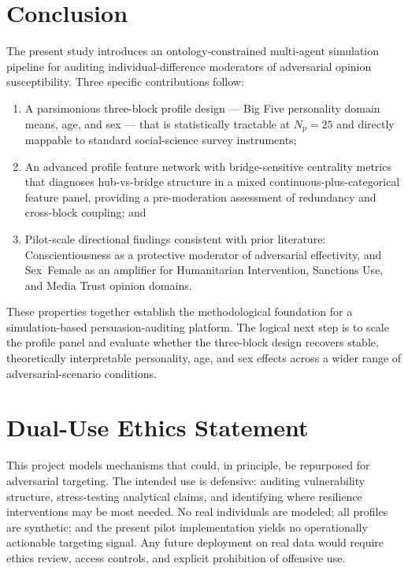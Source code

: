 \documentclass[11pt,a4paper]{article}
\begin{document}
\section{Conclusion}

The present study introduces an ontology-constrained multi-agent simulation pipeline for auditing individual-difference moderators of adversarial opinion susceptibility. Three specific contributions follow:
\begin{enumerate}
  \item A parsimonious three-block profile design --- Big Five personality domain means, age, and sex --- that is statistically tractable at $N_p = 25$ and directly mappable to standard social-science survey instruments;
  \item An advanced profile feature network with bridge-sensitive centrality metrics that diagnoses hub-vs-bridge structure in a mixed continuous-plus-categorical feature panel, providing a pre-moderation assessment of redundancy and cross-block coupling; and
  \item Pilot-scale directional findings consistent with prior literature: Conscientiousness as a protective moderator of adversarial effectivity, and Sex~Female as an amplifier for Humanitarian Intervention, Sanctions Use, and Media Trust opinion domains.
\end{enumerate}

These properties together establish the methodological foundation for a simulation-based persuasion-auditing platform. The logical next step is to scale the profile panel and evaluate whether the three-block design recovers stable, theoretically interpretable personality, age, and sex effects across a wider range of adversarial-scenario conditions.

\section*{Dual-Use Ethics Statement}

This project models mechanisms that could, in principle, be repurposed for adversarial targeting. The intended use is defensive: auditing vulnerability structure, stress-testing analytical claims, and identifying where resilience interventions may be most needed. No real individuals are modeled; all profiles are synthetic; and the present pilot implementation yields no operationally actionable targeting signal. Any future deployment on real data would require ethics review, access controls, and explicit prohibition of offensive use.
\end{document}
